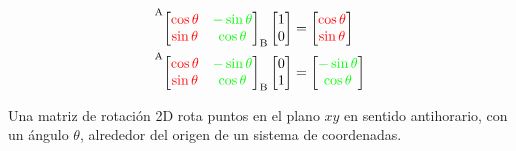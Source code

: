 \begin{frame}
\begin{center}
\begin{minipage}{0.5\linewidth}
            \begin{align*}
                \toCoord{\fromCoord{
                    \begin{bmatrix}
                    \textcolor{red}{\cos \theta} & \textcolor{green}{-\sin \theta}\\
                    \textcolor{red}{\sin \theta} & \textcolor{green}{\cos \theta}
                    \end{bmatrix}}{B}}{A}
                \begin{bmatrix}
                    1\\
                    0
                \end{bmatrix} &=
                \begin{bmatrix}
                    \textcolor{red}{\cos \theta}\\
                    \textcolor{red}{\sin \theta}
                \end{bmatrix}\\
                \toCoord{\fromCoord{
                    \begin{bmatrix}
                    \textcolor{red}{\cos \theta} & \textcolor{green}{-\sin \theta}\\
                    \textcolor{red}{\sin \theta} & \textcolor{green}{\cos \theta}
                    \end{bmatrix}}{B}}{A}
                \begin{bmatrix}
                    0\\
                    1
                \end{bmatrix} &=
                \begin{bmatrix}
                    \textcolor{green}{-\sin \theta}\\
                    \textcolor{green}{\cos \theta}
                \end{bmatrix}
            \end{align*}

        \end{minipage}
    \end{center}
    Una matriz de rotación 2D rota puntos en el plano $xy$ en sentido antihorario, con un ángulo $\theta$, alrededor del origen de un sistema de coordenadas.
\end{frame}

